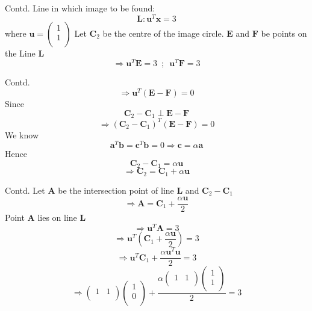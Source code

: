\documentclass[10pt]{beamer}
\begin{document}
\begin{frame}{Contd.}
	Line in which image to be found:
	\[\textbf{L}:  \textbf{u}^{T}\textbf{x} = 3
	\]
	where \( \textbf{u} = \left( {\begin{array}{c}
   1 \\
   1 \\
   \end{array} } \right)\) \newline 
   \newline
   \newline
Let \( \textbf{C}_2 \) be the centre of the image circle.\newline
\(\textbf{E}\) and \( \textbf{F}\) be points on the Line \textbf{L}
\[\Rightarrow \textbf{u}^{T}\textbf{E} = 3 \enspace ;\enspace \textbf{u}^{T}\textbf{F} = 3 \]


\end{frame}




\begin{frame}{Contd.}
\[\Rightarrow \textbf{u}^{T}(\textbf{E}-\textbf{F}) = 0
\]
Since 
\[ \textbf{C}_2-\textbf{C}_1  \perp \textbf{E}-\textbf{F}
\]
\[\Rightarrow
(\textbf{C}_2-\textbf{C}_1)^{T}( \textbf{E}-\textbf{F})=0
\]
We know
\[\textbf{a}^{T}\textbf{b} = \textbf{c}^{T}\textbf{b} = 0  \Rightarrow \textbf{c} = \alpha\textbf{a} 
\]
Hence
\[\textbf{C}_2-\textbf{C}_1 = \alpha \textbf{u} 
\]
\[\Rightarrow \textbf{C}_2=\textbf{C}_1 + \alpha \textbf{u} 
\]
	
\end{frame}



\begin{frame}{Contd.}
Let \textbf{A} be the intersection point of line \textbf{L} and \(\textbf{C}_2-\textbf{C}_1 \)
\[\Rightarrow \textbf{A} =\textbf{C}_1 + \frac{\alpha\textbf{u}}{2}
\]
Point \(\textbf{A}\) lies on line \(\textbf{L}\)
\[\Rightarrow \textbf{u}^{T}\textbf{A} = 3
\]
\[\Rightarrow \textbf{u}^{T}(\textbf{C}_1 +\frac{\alpha\textbf{u}}{2} ) = 3
\]
\[\Rightarrow \textbf{u}^{T}\textbf{C}_1 + \frac{\alpha\textbf{u}^{T}\textbf{u}}{2} = 3
\]
\[\Rightarrow \left( {\begin{array}{cc}
   1 & 1 \\
  \end{array} } \right)\left( {\begin{array}{c}
   1  \\
   0 \\
  \end{array} } \right) + \frac{\alpha \left( {\begin{array}{cc}
   1 & 1 \\
  \end{array} } \right)\left( {\begin{array}{c}
   1  \\
   1 \\
  \end{array} } \right)}{2} = 3 
\]
\end{frame}
\end{document}
